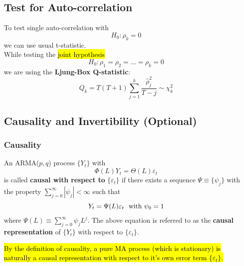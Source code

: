 \documentclass[11pt]{article}
\begin{document}
	\subsection{Test for Auto-correlation}
		\par To test single auto-correlation with 
		\begin{equation}
			H_0: \rho_k = 0
		\end{equation}
		we can use usual t-statistic.\\
		While testing the \hl{joint hypothesis}
		\begin{equation}
			H_0: \rho_1 = \rho_2 = \dots = \rho_k = 0
		\end{equation}
		we are using the \textbf{Ljung-Box Q-statistic}:
		\begin{equation}
			Q_k = T(T+1) \sum_{j=1}^k \frac{\hat{\rho}_j^2}{T-j} \sim \chi_k^2
		\end{equation}
	\subsection{Causality and Invertibility (Optional)}
	\subsubsection{Causality}
		\begin{definition}[Causality]
			An ARMA($p, q$) process $\{Y_t\}$ with 
			\begin{equation}
				\Phi(L)Y_t = \Theta(L)\varepsilon_t
			\end{equation}
			is called \textbf{causal with respect to} $\{\varepsilon_t\}$ if there exists a sequence $\Psi \equiv \{\psi_j\}$ with the property $\sum_{j=0}^\infty |\psi_j| < \infty$ such that 
			\begin{equation}
				Y_t = \Psi(L) \varepsilon_t\ \text{{ with }} \psi_0 = 1
			\end{equation}
			where $\Psi(L) \equiv \sum_{j=0}^\infty \psi_j L^j$. The above equation is referred to as the \textbf{causal representation} of $\{Y_t\}$ with respect to $\{\varepsilon_t\}$.
		\end{definition}
		
		\begin{proposition}
			\hl{By the definition of causality, a pure MA process (which is stationary) is naturally a causal representation with respect to it's own error term $\{\varepsilon_t\}$.}
		\end{proposition}
		
\end{document}
